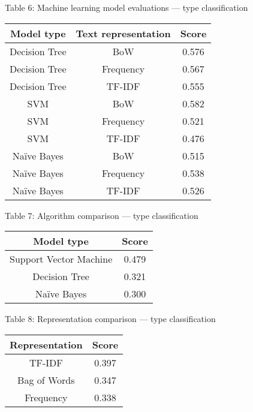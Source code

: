 \documentclass{article}
\begin{document}
\begin{center}
Table 6: Machine learning model evaluations --- type classification\\
\begin{tabular}{ |c|c|c| }
\hline {\bf Model type} & {\bf Text representation} & {\bf Score} \\
\hline Decision Tree & BoW & 0.576\\
\hline Decision Tree & Frequency & 0.567\\
\hline Decision Tree & TF-IDF & 0.555\\
\hline SVM & BoW & 0.582\\
\hline SVM & Frequency & 0.521\\
\hline SVM & TF-IDF & 0.476\\
\hline Naïve Bayes & BoW & 0.515\\
\hline Naïve Bayes & Frequency & 0.538\\
\hline Naïve Bayes & TF-IDF & 0.526\\
\hline
\end{tabular}
\end{center}

\begin{center}
Table 7: Algorithm comparison --- type classification\\
\begin{tabular}{ |c|c| }
\hline {\bf Model type}& {\bf Score}\\
\hline Support Vector Machine & 0.479\\
\hline Decision Tree & 0.321\\
\hline Naïve Bayes & 0.300\\
\hline
\end{tabular}
\end{center}

\begin{center}
Table 8: Representation comparison --- type classification\\
\begin{tabular}{ |c|c| }
\hline {\bf Representation}& {\bf Score}\\
\hline TF-IDF & 0.397\\
\hline Bag of Words & 0.347\\
\hline Frequency & 0.338\\
\hline
\end{tabular}
\end{center}
\end{document}
